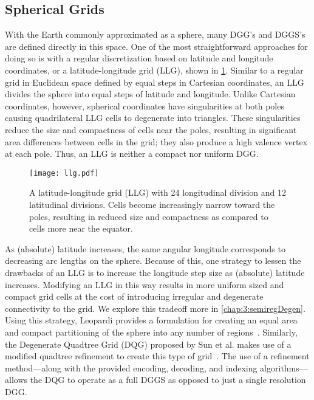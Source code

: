 \subsection{Spherical Grids} \label{chap:2:spherical}
With the Earth commonly approximated as a sphere, many DGG's and DGGS's are defined directly in this space.
One of the most straightforward approaches for doing so is with a regular discretization based on latitude and longitude coordinates, or a latitude-longitude grid (LLG), shown in \cref{fig:llg}.
Similar to a regular grid in Euclidean space defined by equal steps in Cartesian coordinates, an LLG divides the sphere into equal steps of latitude and longitude.
Unlike Cartesian coordinates, however, spherical coordinates have singularities at both poles causing quadrilateral LLG cells to degenerate into triangles.
These singularities reduce the size and compactness of cells near the poles, resulting in significant area differences between cells in the grid; they also produce a high valence vertex at each pole.
Thus, an LLG is neither a compact nor uniform DGG.


\begin{figure}[t!]
	\centering
	\texttt{[image: llg.pdf]}
	\caption[A latitude-longitude grid]{
		A latitude-longitude grid (LLG) with 24 longitudinal division and 12 latitudinal divisions.
		Cells become increasingly narrow toward the poles, resulting in reduced size and compactness as compared to cells more near the equator.
	}
	\label{fig:llg}
\end{figure}


As (absolute) latitude increases, the same angular longitude corresponds to decreasing arc lengths on the sphere.
Because of this, one strategy to lessen the drawbacks of an LLG is to increase the longitude step size as (absolute) latitude increases.
Modifying an LLG in this way results in more uniform sized and compact grid cells at the cost of introducing irregular and degenerate connectivity to the grid.
We explore this tradeoff more in \cref{chap:3:semiregDegen}.
Using this strategy, Leopardi provides a formulation for creating an equal area and compact partitioning of the sphere into any number of regions~\cite{leopardi2006partition}.
Similarly, the Degenerate Quadtree Grid (DQG) proposed by Sun et al. makes use of a modified quadtree refinement to create this type of grid~\cite{sun2008global}.
The use of a refinement method---along with the provided encoding, decoding, and indexing algorithms---allows the DQG to operate as a full DGGS as opposed to just a single resolution DGG.



